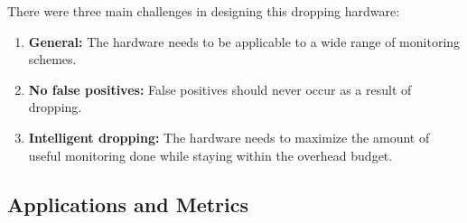 There were three main challenges in designing this dropping hardware:
\begin{enumerate}
  \item \textbf{General:} The hardware needs to be applicable to a wide range of monitoring schemes.
  \item \textbf{No false positives:} False positives should never occur as a result of dropping.
  \item \textbf{Intelligent dropping:} The hardware needs to maximize the amount of useful monitoring done while staying within the overhead budget.
\end{enumerate}


\subsection{Applications and Metrics}



